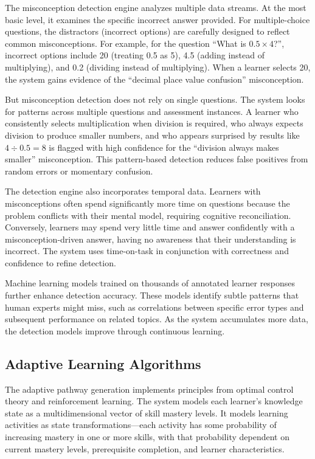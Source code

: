 \documentclass[12pt,a4paper]{article}
\begin{document}
The misconception detection engine analyzes multiple data streams. At the most basic level, it examines the specific incorrect answer provided. For multiple-choice questions, the distractors (incorrect options) are carefully designed to reflect common misconceptions. For example, for the question ``What is $0.5 \times 4$?'', incorrect options include 20 (treating 0.5 as 5), 4.5 (adding instead of multiplying), and 0.2 (dividing instead of multiplying). When a learner selects 20, the system gains evidence of the ``decimal place value confusion'' misconception.

But misconception detection does not rely on single questions. The system looks for patterns across multiple questions and assessment instances. A learner who consistently selects multiplication when division is required, who always expects division to produce smaller numbers, and who appears surprised by results like $4 \div 0.5 = 8$ is flagged with high confidence for the ``division always makes smaller'' misconception. This pattern-based detection reduces false positives from random errors or momentary confusion.

The detection engine also incorporates temporal data. Learners with misconceptions often spend significantly more time on questions because the problem conflicts with their mental model, requiring cognitive reconciliation. Conversely, learners may spend very little time and answer confidently with a misconception-driven answer, having no awareness that their understanding is incorrect. The system uses time-on-task in conjunction with correctness and confidence to refine detection.

Machine learning models trained on thousands of annotated learner responses further enhance detection accuracy. These models identify subtle patterns that human experts might miss, such as correlations between specific error types and subsequent performance on related topics. As the system accumulates more data, the detection models improve through continuous learning.

\subsection{Adaptive Learning Algorithms}

The adaptive pathway generation implements principles from optimal control theory and reinforcement learning. The system models each learner's knowledge state as a multidimensional vector of skill mastery levels. It models learning activities as state transformations---each activity has some probability of increasing mastery in one or more skills, with that probability dependent on current mastery levels, prerequisite completion, and learner characteristics.
\end{document}
